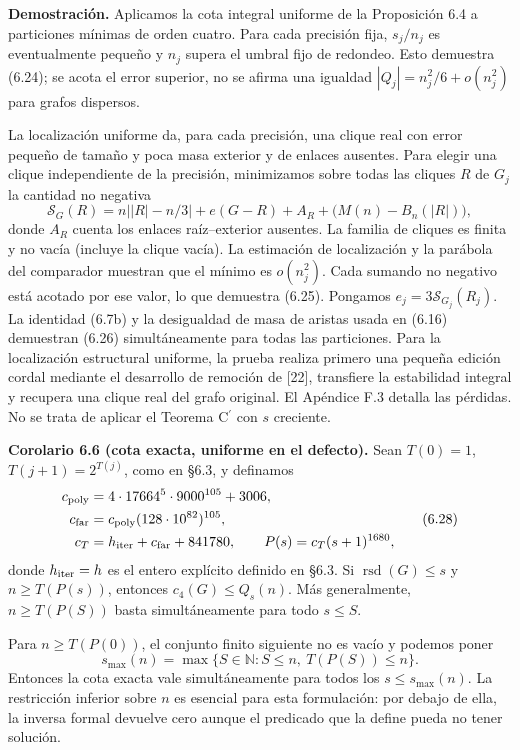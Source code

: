 \documentclass[spanish,11pt,a4paper]{article}
\begin{document}
\textbf{Demostración.} Aplicamos la cota integral uniforme de la Proposición 6.4 a particiones mínimas de orden cuatro. Para cada precisión fija, \(s_j/n_j\) es eventualmente pequeño y \(n_j\) supera el umbral fijo de redondeo. Esto demuestra (6.24); se acota el error superior, no se afirma una igualdad \(|Q_j|=n_j^2/6+o(n_j^2)\) para grafos dispersos.

La localización uniforme da, para cada precisión, una clique real con error pequeño de tamaño y poca masa exterior y de enlaces ausentes. Para elegir una clique independiente de la precisión, minimizamos sobre todas las cliques \(R\) de \(G_j\) la cantidad no negativa \[
\mathcal S_G(R)=n\bigl||R|-n/3\bigr|
 +e(G-R)+A_R+\bigl(M(n)-B_n(|R|)\bigr),
\tag{6.27}
\] donde \(A_R\) cuenta los enlaces raíz--exterior ausentes. La familia de cliques es finita y no vacía (incluye la clique vacía). La estimación de localización y la parábola del comparador muestran que el mínimo es \(o(n_j^2)\). Cada sumando no negativo está acotado por ese valor, lo que demuestra (6.25). Pongamos \(e_j=3\mathcal S_{G_j}(R_j)\). La identidad (6.7b) y la desigualdad de masa de aristas usada en (6.16) demuestran (6.26) simultáneamente para todas las particiones. Para la localización estructural uniforme, la prueba realiza primero una pequeña edición cordal mediante el desarrollo de remoción de {[}22{]}, transfiere la estabilidad integral y recupera una clique real del grafo original. El Apéndice F.3 detalla las pérdidas. No se trata de aplicar el Teorema \texorpdfstring{C\ensuremath{^{\prime}}}{C'} con \(s\) creciente.


\textbf{Corolario 6.6 (cota exacta, uniforme en el defecto).} Sean \(T(0)=1\), \(T(j+1)=2^{T(j)}\), como en §6.3, y definamos \[
\begin{aligned}
c_{\rm poly}&=4\cdot17664^5\cdot9000^{105}+3006,\\
c_{\rm far}&=c_{\rm poly}(128\cdot10^{82})^{105},\\
c_T&=h_{\rm iter}+c_{\rm far}+841780,\qquad
P(s)=c_T(s+1)^{1680},
\end{aligned}
\tag{6.28}
\] donde \(h_{\rm iter}=h\) es el entero explícito definido en §6.3. Si \(\operatorname{rsd}(G)\le s\) y \(n\ge T(P(s))\), entonces \(c_4(G)\le Q_s(n)\). Más generalmente, \(n\ge T(P(S))\) basta simultáneamente para todo \(s\le S\).

Para \(n\ge T(P(0))\), el conjunto finito siguiente no es vacío y podemos poner \[
s_{\max}(n)=\max\{S\in\mathbb N:S\le n,\ T(P(S))\le n\}.
\tag{6.29}
\] Entonces la cota exacta vale simultáneamente para todos los \(s\le s_{\max}(n)\). La restricción inferior sobre \(n\) es esencial para esta formulación: por debajo de ella, la inversa formal devuelve cero aunque el predicado que la define pueda no tener solución.
\end{document}
